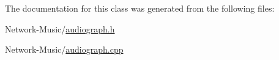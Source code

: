 The documentation for this class was generated from the following files\-:\begin{DoxyCompactItemize}
\item 
Network-\/\-Music/\hyperlink{audiograph_8h}{audiograph.\-h}\item 
Network-\/\-Music/\hyperlink{audiograph_8cpp}{audiograph.\-cpp}\end{DoxyCompactItemize}
